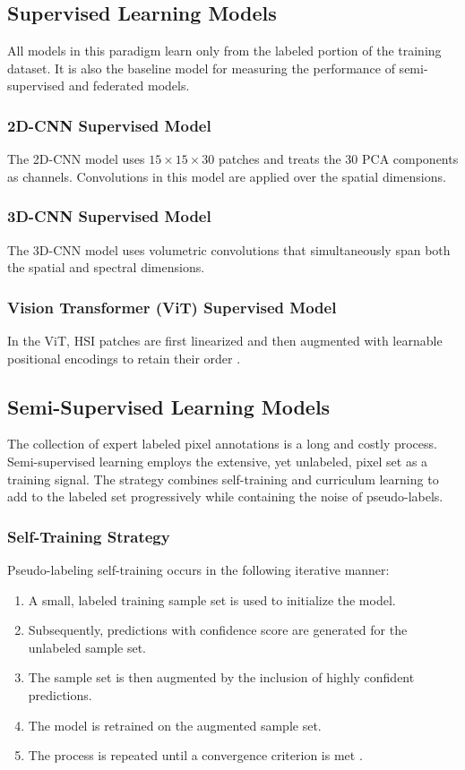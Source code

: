 \subsection{Supervised Learning Models}
All models in this paradigm learn only from the labeled portion of the training dataset. It is also the baseline model for measuring the performance of semi-supervised and federated models. 

\subsubsection{2D-CNN Supervised Model}
The 2D-CNN model uses $15 \times 15 \times 30$ patches and treats the 30 PCA components as channels. Convolutions in this model are applied over the spatial dimensions. 

\subsubsection{3D-CNN Supervised Model}
The 3D-CNN model uses volumetric convolutions that simultaneously span both the spatial and spectral dimensions.

\subsubsection{Vision Transformer (ViT) Supervised Model}
In the ViT, HSI patches are first linearized and then augmented with learnable positional encodings to retain their order \cite{dosovitskiy2020image}.

\subsection{Semi-Supervised Learning Models}
The collection of expert labeled pixel annotations is a long and costly process. Semi-supervised learning employs the extensive, yet unlabeled, pixel set as a training signal. The strategy combines self-training and curriculum learning to add to the labeled set progressively while containing the noise of pseudo-labels.

\subsubsection{Self-Training Strategy}
Pseudo-labeling self-training occurs in the following iterative manner:
\begin{enumerate}
    \item A small, labeled training sample set is used to initialize the model.
    \item Subsequently, predictions with confidence score are generated for the unlabeled sample set.
    \item The sample set is then augmented by the inclusion of highly confident predictions.
    \item The model is retrained on the augmented sample set.
    \item The process is repeated until a convergence criterion is met \cite{triguero2015self}.
\end{enumerate}

